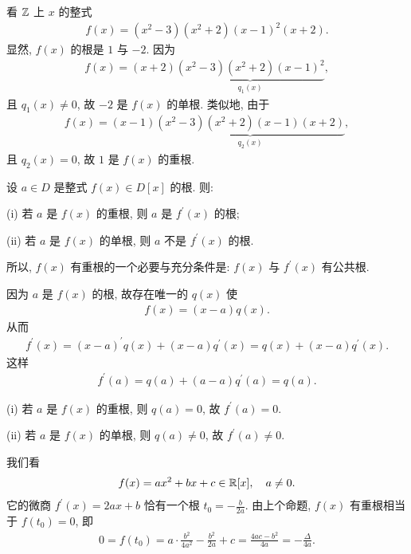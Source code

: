 \begin{example}
    看 $\mathbb{Z}$ 上 $x$ 的整式
    \begin{align*}
        f(x) = (x^2 - 3)(x^2 + 2)(x - 1)^2 (x + 2).
    \end{align*}
    显然, $f(x)$ 的根是 $1$ 与 $-2$. 因为
    \begin{align*}
        f(x) = (x + 2) \underbrace{(x^2 - 3)(x^2 + 2)(x - 1)^2}_{q_1 (x)},
    \end{align*}
    且 $q_1 (x) \neq 0$, 故 $-2$ 是 $f(x)$ 的单根. 类似地, 由于
    \begin{align*}
        f(x) = (x - 1) \underbrace{(x^2 - 3)(x^2 + 2)(x - 1)(x + 2)}_{q_2 (x)},
    \end{align*}
    且 $q_2 (x) = 0$, 故 $1$ 是 $f(x)$ 的重根.
\end{example}

\begin{proposition}
    设 $a \in D$ 是整式 $f(x) \in D[x]$ 的根. 则:

    (i) 若 $a$ 是 $f(x)$ 的重根, 则 $a$ 是 $f^{\prime} (x)$ 的根;

    (ii) 若 $a$ 是 $f(x)$ 的单根, 则 $a$ 不是 $f^{\prime} (x)$ 的根.

    所以, $f(x)$ 有重根的一个必要与充分条件是: $f(x)$ 与 $f^{\prime} (x)$ 有公共根.
\end{proposition}

\begin{pf}
    因为 $a$ 是 $f(x)$ 的根, 故存在唯一的 $q(x)$ 使
    \begin{align*}
        f(x) = (x - a) q(x).
    \end{align*}
    从而
    \begin{align*}
        f^{\prime} (x) = (x - a)^{\prime} q(x) + (x - a) q^{\prime} (x) = q(x) + (x - a) q^{\prime} (x).
    \end{align*}
    这样
    \begin{align*}
        f^{\prime} (a) = q(a) + (a - a) q^{\prime} (a) = q(a).
    \end{align*}

    (i) 若 $a$ 是 $f(x)$ 的重根, 则 $q(a) = 0$, 故 $f^{\prime} (a) = 0$.

    (ii) 若 $a$ 是 $f(x)$ 的单根, 则 $q(a) \neq 0$, 故 $f^{\prime} (a) \neq 0$.
\end{pf}

\begin{example}
    我们看
    \begin{align*}
        f(x) = ax^2 + bx + c \in \mathbb{R}[x], \quad a \neq 0.
    \end{align*}
    它的微商 $f^{\prime} (x) = 2ax + b$ 恰有一个根 $t_0 = -\frac{b}{2a}$. 由上个命题, $f(x)$ 有重根相当于 $f(t_0) = 0$, 即
    \begin{align*}
        0 = f(t_0) = a \cdot \frac{b^2}{4a^2} - \frac{b^2}{2a} + c = \frac{4ac - b^2}{4a} = -\frac{\Delta}{4a}.
    \end{align*}
\end{example}
